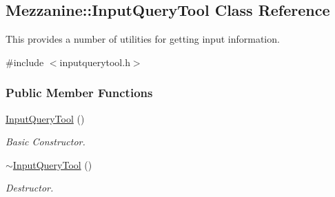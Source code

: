 \hypertarget{classMezzanine_1_1InputQueryTool}{
\subsection{Mezzanine::InputQueryTool Class Reference}
\label{classMezzanine_1_1InputQueryTool}
}


This provides a number of utilities for getting input information.  




{\ttfamily \#include $<$inputquerytool.h$>$}

\subsubsection*{Public Member Functions}
\begin{DoxyCompactItemize}
\item 
\hyperlink{classMezzanine_1_1InputQueryTool_ad339efbc61123c63ad1245dfc0320ff6}{InputQueryTool} ()
\begin{DoxyCompactList}\small\item\em Basic Constructor. \item\end{DoxyCompactList}\item 
\hyperlink{classMezzanine_1_1InputQueryTool_ae54b04ff1cffda1df2f25c3c01f616cd}{$\sim$InputQueryTool} ()
\begin{DoxyCompactList}\small\item\em Destructor. \item\end{DoxyCompactList}\end{DoxyCompactItemize}
